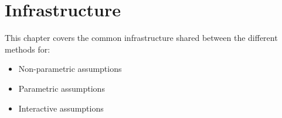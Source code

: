 \chapter{Infrastructure}

This chapter covers the common infrastructure shared between the
different methods for:
\begin{itemize}
\item Non-parametric assumptions
\item Parametric assumptions
\item Interactive assumptions
\end{itemize}